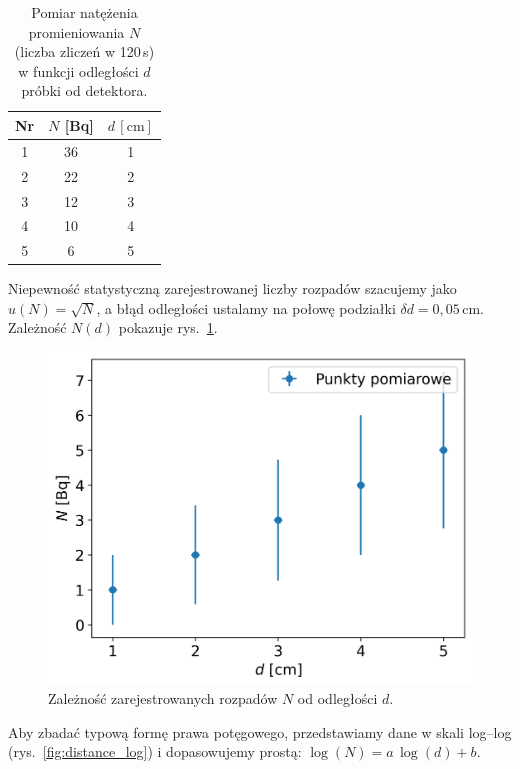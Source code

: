 \documentclass[12pt]{article}
\begin{document}
\begin{table}[H]
	\centering
	\begin{tabular}{c|c|c}
		\toprule
		Nr & $N$ [Bq] & $d\,[\mathrm{cm}]$ \\
		\midrule
		1  & 36       & 1                  \\
		2  & 22       & 2                  \\
		3  & 12       & 3                  \\
		4  & 10       & 4                  \\
		5  & 6        & 5                  \\
		\bottomrule
	\end{tabular}
	\caption{Pomiar natężenia promieniowania $N$ (liczba zliczeń w 120\,s) w funkcji odległości $d$ próbki od detektora.}
	\label{tab:distance_measurments}
\end{table}

Niepewność statystyczną zarejestrowanej liczby rozpadów szacujemy jako \(u(N)=\sqrt{N}\), a błąd odległości ustalamy na połowę podziałki \(\delta d=0{,}05\,\mathrm{cm}\). Zależność \(N(d)\) pokazuje rys.~\ref{fig:distance}.

\begin{figure}[H]
	\centering
	\includegraphics[scale=0.68]{distance}
	\caption{Zależność zarejestrowanych rozpadów $N$ od odległości $d$.}
	\label{fig:distance}
\end{figure}

Aby zbadać typową formę prawa potęgowego, przedstawiamy dane w skali log–log (rys.~\ref{fig:distance_log}) i dopasowujemy prostą: \(\log(N)=a\,\log(d)+b\).
\end{document}
